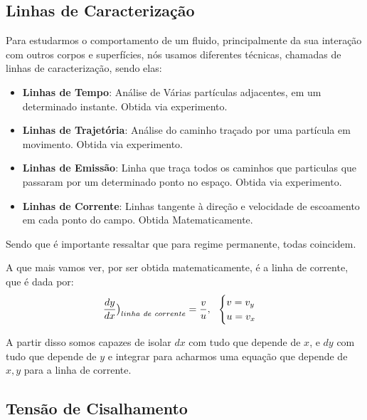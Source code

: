 \documentclass{article}
\begin{document}
        \subsection{Linhas de Caracterização}
            Para estudarmos o comportamento de um fluido, principalmente da sua interação com outros corpos e superfícies, nós usamos diferentes técnicas, chamadas de linhas de caracterização, sendo
            elas:
            \begin{itemize}
                \item \textbf{Linhas de Tempo}: Análise de Várias partículas adjacentes, em um determinado instante. Obtida via experimento.
                \item \textbf{Linhas de Trajetória}: Análise do caminho traçado por uma partícula em movimento. Obtida via experimento.
                \item \textbf{Linhas de Emissão}: Linha que traça todos os caminhos que particulas que passaram por um determinado ponto no espaço. Obtida via experimento.
                \item \textbf{Linhas de Corrente}: Linhas tangente à direção e velocidade de escoamento em cada ponto do campo. Obtida Matematicamente.
            \end{itemize}

            Sendo que é importante ressaltar que para regime permanente, todas coincidem.

            A que mais vamos ver, por ser obtida matematicamente, é a linha de corrente, que é dada por:
            \begin{align}
                \frac{dy}{dx} \big{)}_{linha \ de \ corrente} = \frac{v}{u}, \ \ \begin{cases}
                    v = v_y \\ 
                    u = v_x
                \end{cases}
            \end{align}

            A partir disso somos capazes de isolar $dx$ com tudo que depende de $x$, e $dy$ com tudo que depende de $y$ e integrar para acharmos uma equação que depende de $x,y$ para a linha de
            corrente.
            
        \subsection{Tensão de Cisalhamento}
\end{document}

